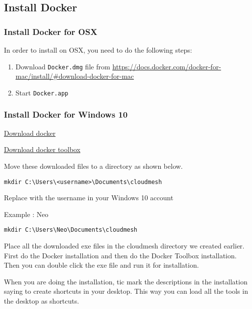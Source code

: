 \subsection{Install Docker}\label{install-docker}

\subsubsection{Install Docker for OSX}\label{install-docker-for-osx}

In order to install on OSX, you need to do the following steps:

\begin{enumerate}
\def\labelenumi{\arabic{enumi}.}
\item
  Download \texttt{Docker.dmg} file from
  \href{}{https://docs.docker.com/docker-for-mac/install/\#download-docker-for-mac}
\item
  Start \texttt{Docker.app}
\end{enumerate}

\subsubsection{Install Docker for Windows
10}\label{install-docker-for-windows-10}

\href{https://download.docker.com/win/stable/Docker\%20for\%20Windows\%20Installer.exe}{Download
docker}

\href{https://download.docker.com/win/stable/DockerToolbox.exe}{Download
docker toolbox}

Move these downloaded files to a directory as shown below.

\begin{verbatim}
mkdir C:\Users\<username>\Documents\cloudmesh
\end{verbatim}

Replace with the username in your Windows 10 account

Example : Neo

\begin{verbatim}
mkdir C:\Users\Neo\Documents\cloudmesh
\end{verbatim}

Place all the downloaded exe files in the cloudmesh directory we created
earlier. First do the Docker installation and then do the Docker Toolbox
installation. Then you can double click the exe file and run it for
installation.

When you are doing the installation, tic mark the descriptions in the
installation saying to create shortcuts in your desktop. This way you
can load all the tools in the desktop as shortcuts.

